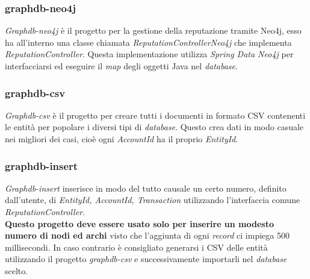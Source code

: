 \subsubsection{graphdb-neo4j}
\textit{Graphdb-neo4j} è il progetto per la gestione della reputazione tramite Neo4j, esso ha all'interno una classe chiamata \textit{ReputationControllerNeo4j} che implementa \textit{ReputationController}. Questa implementazione utilizza \textit{Spring Data Neo4j} per interfacciarsi ed eseguire il \textit{map} degli oggetti Java nel \textit{database}.


\subsubsection{graphdb-csv}
\textit{Graphdb-csv} è il progetto per creare tutti i documenti in formato CSV contenenti le entità per popolare i diversi tipi di \textit{database}. Questo crea dati in modo casuale nei migliori dei casi, cioè ogni \textit{AccountId} ha il proprio \textit{EntityId}.\\

\subsubsection{graphdb-insert}
\textit{Graphdb-insert} inserisce in modo del tutto causale un certo numero, definito dall'utente, di \textit{EntityId, AccountId, Transaction} utilizzando l'interfaccia comune \textit{ReputationController}.\\
\textbf{Questo progetto deve essere usato solo per inserire un modesto numero di nodi ed archi} visto che l'aggiunta di ogni \textit{record} ci impiega 500 millisecondi. In caso contrario è consigliato generarsi i CSV delle entità utilizzando il progetto \textit{graphdb-csv} e successivamente importarli nel \textit{database} scelto.
